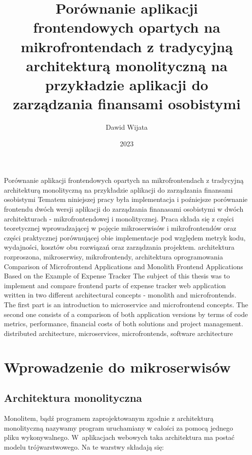 \documentclass{SGGW-thesis}
\title{Porównanie aplikacji frontendowych opartych na mikrofrontendach z tradycyjną architekturą monolityczną na przykładzie aplikacji do zarządzania finansami osobistymi}
\author{Dawid Wijata}
\date{2023}
\begin{document}
\maketitle
\statementpage
\abstractpage
{Porównanie aplikacji frontendowych opartych na mikrofrontendach z tradycyjną architekturą monolityczną na przykładzie aplikacji do zarządzania finansami osobistymi}
{Tematem niniejszej pracy była implementacja i poźniejsze porównanie frontendu dwóch wersji aplikacji do zarządzania finanasami osobistymi w dwóch architekturach - mikrofrontendowej i monolitycznej. Praca składa się z części teoretycznej wprowadzającej w pojęcie mikroserwisów i mikrofrontendów oraz części praktycznej porównującej obie implementacje pod względem metryk kodu, wydajności, kosztów obu rozwiązań oraz zarządzania projektem.}
{architektura rozproszona, mikroserwisy, mikrofrontendy, architektura oprogramowania}
{Comparison of Microfrontend Applications and Monolith Frontend Applications Based on the Example of Expense Tracker}
{The subject of this thesis was to implement and compare frontend parts of expense tracker web application written in two different architectural concepts - monolith and microfrontends. The first part is an introduction to microservice and microfrontend concepts. The second one consists of a comparison of both application versions by terms of code metrics, performance, financial costs of both solutions and project management.}
{distributed architecture, microservices, microfrontends, software architecture}


{
  \doublespacing
  \tableofcontents
}

\startchapterfromoddpage %

\chapter{Wprowadzenie do mikroserwisów}
  \section{Architektura monolityczna}
  Monolitem, bądź programem zaprojektowanym zgodnie z architekturą monolityczną nazywamy program uruchamiany w całości za pomocą jednego pliku wykonywalnego. W~aplikacjach webowych taka architektura ma postać modelu trójwarstwowego. Na te warstwy składają się:
  
\end{document}
